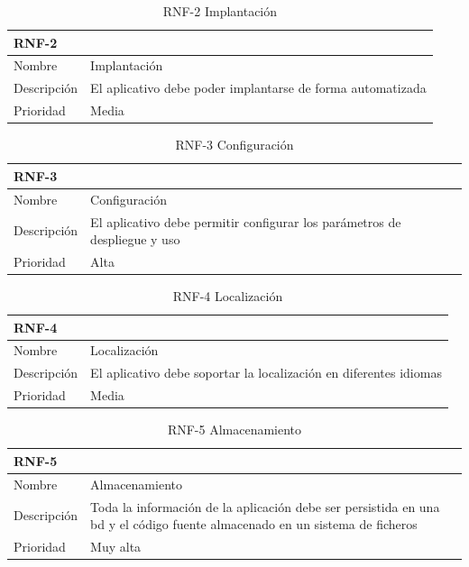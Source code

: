 \documentclass[11pt,spanish,listoffigures,listoftables]{tfgetsinf}
\begin{document}
\begin{table}[ht!]
	\centering
	\begin{tabular}{ |p{4cm}||p{10cm}|  }
		\multicolumn{2}{l}{\textbf{RNF-2}} \\
		\hline
		Nombre   & Implantación \\
		\hline
		Descripción  & El aplicativo debe poder implantarse de forma automatizada \\
		\hline
		Prioridad &  Media \\
		\hline
	\end{tabular}
	\caption{RNF-2 Implantación}
	\label{table:22}
\end{table}

\begin{table}[ht!]
	\centering
	\begin{tabular}{ |p{4cm}||p{10cm}|  }
		\multicolumn{2}{l}{\textbf{RNF-3}} \\
		\hline
		Nombre   & Configuración \\
		\hline
		Descripción  & El aplicativo debe permitir configurar los parámetros de despliegue y uso \\
		\hline
		Prioridad &  Alta \\
		\hline
	\end{tabular}
	\caption{RNF-3 Configuración}
	\label{table:23}
\end{table}

\begin{table}[ht!]
	\centering
	\begin{tabular}{ |p{4cm}||p{10cm}|  }
		\multicolumn{2}{l}{\textbf{RNF-4}} \\
		\hline
		Nombre   & Localización \\
		\hline
		Descripción  & El aplicativo debe soportar la localización en diferentes idiomas \\
		\hline
		Prioridad &  Media \\
		\hline
	\end{tabular}
	\caption{RNF-4 Localización}
	\label{table:24}
\end{table}

\begin{table}[ht!]
	\centering
	\begin{tabular}{ |p{4cm}||p{10cm}|  }
		\multicolumn{2}{l}{\textbf{RNF-5}} \\
		\hline
		Nombre & Almacenamiento \\
		\hline
		Descripción  & Toda la información de la aplicación debe ser persistida en una \acrfull{bd} y el código fuente almacenado en un sistema de ficheros \\
		\hline
		Prioridad &  Muy alta \\
		\hline
	\end{tabular}
	\caption{RNF-5 Almacenamiento}
	\label{table:25}
\end{table}
\end{document}
